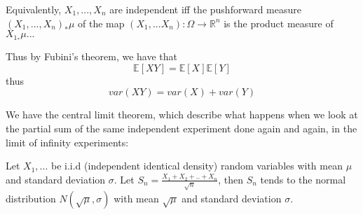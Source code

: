 \documentclass[main.tex]{subfiles}
\begin{document}
Equivalently, $X_1, ... , X_n$ are independent iff the pushforward measure $(X_1, ..., X_n)_* \mu$ of the map 
$(X_1, ... X_n): \Omega \rightarrow \mathbb{R}^n$ is the product measure of $X_1_* \mu ... $

Thus by Fubini's theorem, we have that
$$
\mathbb{E}[XY] = \mathbb{E}[X] \mathbb{E}[Y]
$$
thus 
$$
var(XY) = var(X) + var(Y)
$$



We have the central limit theorem, which describe what happens when we look at the partial sum of the same independent experiment done again and again, in the limit of infinity experiments:



\begin{theorem}
Let $X_1, ...$ be i.i.d (independent identical density) random variables with mean $\mu$ and standard deviation $\sigma$. Let $S_n = \frac{X_1 + X_2 + .. + X_n}{\sqrt{n}}$, then $S_n$ tends to the normal distribution $N(\sqrt{\mu}, \sigma) $ with mean $\sqrt{\mu}$ and standard deviation $\sigma$. 
\end{theorem}
\end{document}
